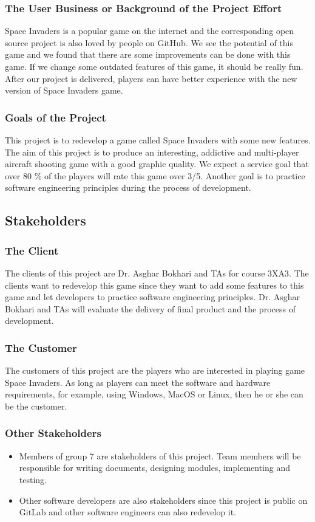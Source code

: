 \documentclass[12pt]{article}
\begin{document}
\subsubsection{The User Business or Background of the Project Effort}
Space Invaders is a popular game on the internet and the
corresponding open source project is also loved by people on GitHub. We see the potential of this game and we found that there are some improvements can be done with this game. If we change some outdated features of this game, it should be really fun. After our project is delivered, players can
have better experience with the new version of Space Invaders game.
\subsubsection{Goals of the Project}
This project is to redevelop a game called Space Invaders with
some new features. The aim of this project is to produce an
interesting, addictive and multi-player aircraft shooting game
with a good graphic quality. We expect a service goal that over 80
\% of the players will rate this game over 3/5. Another goal is
to practice software engineering principles during the 
process of development.
\subsection{Stakeholders}
\subsubsection{The Client}
The clients of this project are Dr. Asghar Bokhari and TAs for
course 3XA3. The clients want to redevelop this game since
they 
want to add some features to this game and let developers to
practice software engineering principles. Dr. Asghar Bokhari and TAs will evaluate the delivery of final product and the
process of development.
\subsubsection{The Customer}
The customers of this project are the players who are interested in playing game Space Invaders. As long as 
players can meet the software and hardware requirements, for
example, using Windows, MacOS or Linux, then he or she can be the
customer.
\subsubsection{Other Stakeholders}
\begin{itemize}
\item Members of group 7 are stakeholders of this project. 
Team members will be responsible for writing documents, 
designing modules, implementing and testing.
\item Other software developers are also stakeholders since
this project is public on GitLab and other software
engineers can also redevelop it.
\end{itemize}
\end{document}
